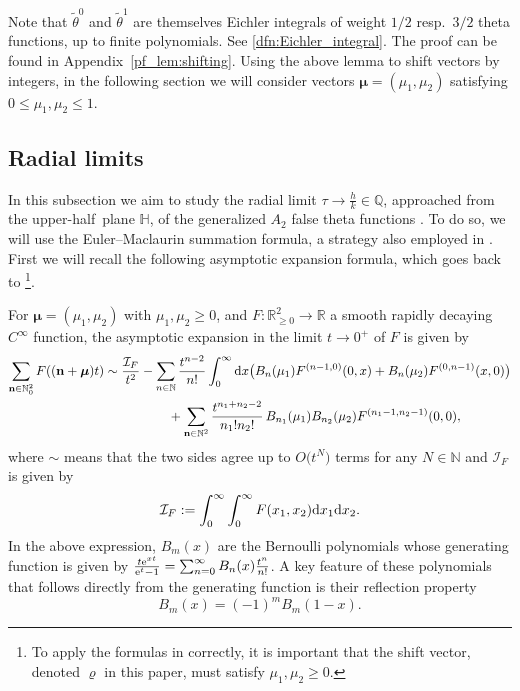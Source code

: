 \documentclass[pdftex]{sigma}
\def\BR{\mathbb{R}}
\def\bos{\varrho}
\def\bmu{\boldsymbol{\mu}}
\theoremstyle{definition}
\numberwithin{equation}{section}
\begin{document}
Note that ${\tilde \theta}^0$ and ${\tilde \theta}^1$ are themselves Eichler integrals of weight $1/2$ resp.\ $3/2$ theta functions, up to finite polynomials. See \eqref{dfn:Eichler_integral}.
The proof can be found in Appendix~\ref{pf_lem:shifting}.
Using the above lemma to shift vectors by integers, in the following section we will consider vectors $\bmu=(\mu_1,\mu_2)$ satisfying $ 0\leq \mu_1, \mu_2 \leq 1$.

\subsection{Radial limits}
\label{subsec:rad_lim}

In this subsection we aim to study the radial limit $\tau \to \frac{h}{k}\in\mathbb{Q}$, approached from the upper-half~plane $\mathbb H$, of the generalized $A_{2}$ false theta functions \smash{$F^{(\bos)}(\tau)$}. To do so, we will use the Euler--Maclaurin summation formula, a strategy also employed in \cite{bringmann2018higher}. First we will recall the following asymptotic expansion formula, which goes back to \cite{Zagier77}\footnote{To apply the formulas in \cite{Zagier77} correctly, it is important that the shift vector, denoted $\bos$ in this paper, must satisfy $\mu_1, \mu_2 \geq 0$.}.

For $\bmu=(\mu_1,\mu_2)$ with $ \mu_1, \mu_2\geq 0$, and $F\colon \BR^2_{\geq 0}\to\BR$ a smooth rapidly decaying $C^\infty$ function, the asymptotic expansion in the limit $t\to 0^+$ of $F$ is given by \cite{Zagier77}
\begin{gather}
		\sum_{\mathbf{n}\in\mathbb{N}_0^2} F((\mathbf{n} + \bmu) t ) \sim \frac{\mathcal{I}_F}{t^2} - \sum_{n\in\mathbb{N}} \frac{t^{n-2} }{ n! } \int_0^\infty {\rm d}x \bigl( {B_{n}(\mu_1)} F^{(n-1,0)} (0,x) +{B_{n}(\mu_2)} F^{(0,n-1)} (x,0) \bigr) \nonumber\\
\hphantom{\sum_{\mathbf{n}\in\mathbb{N}_0^2} F((\mathbf{n} + \bmu) t ) \sim}{}
 +
		\sum_{\mathbf{n}\in\mathbb{N}^2} \frac{ t^{n_1+n_2-2} }{ n_1! n_2! }\,B_{n_1}(\mu_1) B_{n_2}(\mu_2)
		F^{(n_1-1,n_2-1)} (0,0),\label{def:EM}
\end{gather}
where $\sim$ means that the two sides agree up to $O\bigl(t^N\bigr)$ terms for any $N\in\mathbb{N}$ and $\mathcal{I}_F$ is given by
\[
\mathcal{I}_F:=\int_0^\infty\int_0^\infty F(x_1,x_2){\rm d}x_1{\rm d}x_2 .
\]
In the above expression, $B_m(x)$ are the Bernoulli polynomials whose generating function is given by $\frac{t{\rm e}^{xt}}{ {\rm e}^t-1} = \sum_{n=0}^\infty B_n(x)\frac{t^n}{n!}$. A key feature of these polynomials that follows directly from the generating function is their reflection property
\begin{equation}\label{reflectionpropertyBernoulli}
	B_{m}(x)=(-1)^m B_{m}(1-x) .
\end{equation}
\end{document}
